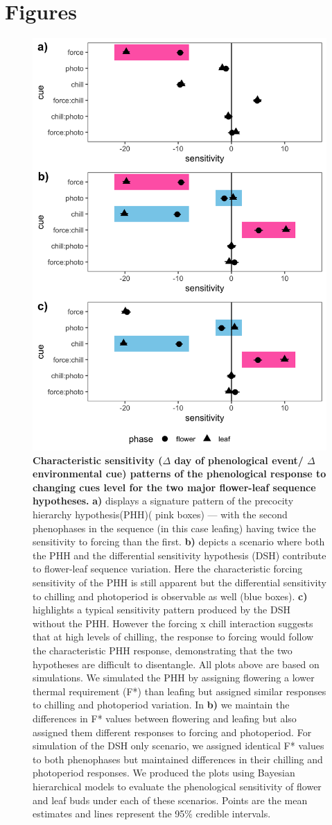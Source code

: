 \documentclass[11pt]{article}\usepackage[]{graphicx}\usepackage[]{color}
\begin{document}
\section*{Figures}
\begin{figure}[h!]
    \centering
         \includegraphics[width=.7\textwidth]{..//Plots/Flobuds_manuscript_figs/simulations.png}
    \caption{\textbf{Characteristic sensitivity ($\Delta$ day of phenological event/ $\Delta$ environmental cue) patterns of the phenological response to changing cues level for the two major flower-leaf sequence hypotheses.}  \textbf{a)} displays a signature pattern of the precocity hierarchy hypothesis(PHH)( pink boxes) --- with the second phenophases in the sequence (in this case leafing) having twice the sensitivity to forcing than the first. \textbf{b)} depicts a scenario where both the PHH and the differential sensitivity hypothesis (DSH) contribute to flower-leaf sequence variation. Here the characteristic forcing sensitivity of the PHH is still apparent but the differential sensitivity to chilling and photoperiod is observable as well (blue boxes). \textbf{c)} highlights a typical sensitivity pattern produced by the DSH without the PHH. However the forcing x chill interaction suggests that at high levels of chilling, the response to forcing would follow the characteristic PHH response, demonstrating that the two hypotheses are difficult to disentangle. All plots above are based on simulations. We simulated the PHH by assigning flowering a lower thermal requirement (F*) than leafing but assigned similar responses to chilling and photoperiod variation. In \textbf{b)} we maintain the differences in F* values between flowering and leafing but also assigned them different responses to forcing and photoperiod. For simulation of the DSH only scenario, we assigned identical F* values to both phenophases but maintained differences in their chilling and photoperiod responses. We produced the plots using Bayesian hierarchical models to evaluate the phenological sensitivity  of flower and leaf buds under each of these scenarios. Points are the mean estimates and lines represent the 95\% credible intervals. } 

\end{figure}
\end{document}
